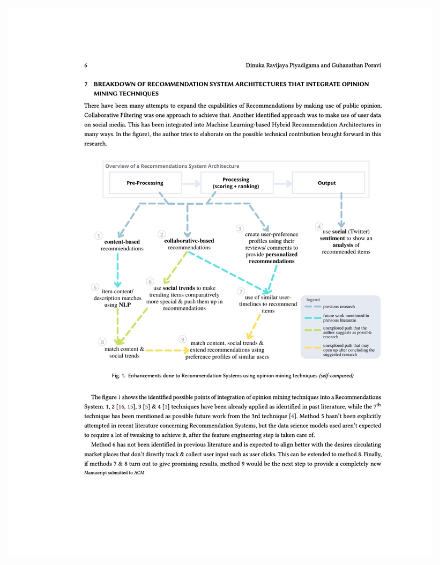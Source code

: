 \begin{figure}[h!]
\centering
\includegraphics[width=\textwidth]{images/appendix/papers/review/A Review on Pushing the Limits of Baseline Recommendation Systems with the integration of Opinion Mining & Information Retrieval Techniques 6.jpeg}
\end{figure}

